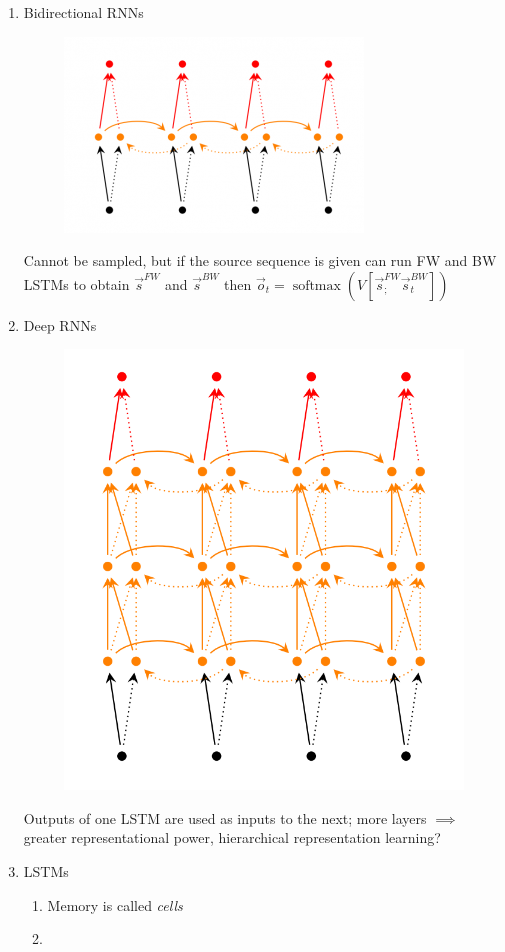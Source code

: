 \documentclass[a4paper,oneside,reqno,onecolumn]{amsart}
\newcommand{\s}{\vec{s}}
\renewcommand{\o}{\vec{o}}
\DeclareMathOperator*{\softmax}{softmax}
\begin{document}
\begin{enumerate}
    \item Bidirectional RNNs
        \begin{figure}[htpb]
            \centering
            \includegraphics[width=0.8\linewidth]{Figures/bi-rnn.png}
            \caption{}
        \end{figure}
        Cannot be sampled, but if the source sequence is given can run FW and BW LSTMs
        to obtain $\s^{FW}$ and $\s^{BW}$ then $\o_t = \softmax(V [\s^{FW}_; \s^{BW}_t])$
    \item Deep RNNs
        \begin{figure}[htpb]
            \centering
            \includegraphics[width=0.8\linewidth]{Figures/deep-rnn.png}
            \caption{}
        \end{figure}
        Outputs of one LSTM are used as inputs to the next; more layers $\implies$
        greater representational power, hierarchical representation learning?
    \item LSTMs
        \begin{enumerate}
            \item Memory is called \emph{cells}
            \item 
        \end{enumerate}


\end{enumerate}
\end{document}
